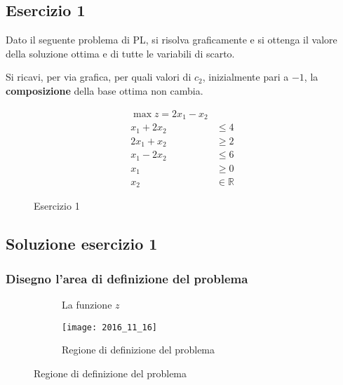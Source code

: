 \documentclass[\main/main.tex]{subfiles}
\begin{document}
\subsection{Esercizio 1}
Dato il seguente problema di PL, si risolva graficamente e si ottenga il valore della soluzione ottima e di tutte le variabili di scarto.

Si ricavi, per via grafica, per quali valori di $c_2$, inizialmente pari a $-1$, la \textbf{composizione} della base ottima non cambia.

\begin{figure}
  \begin{align*}
    \max z = 2x_1 - x_2         \\
    x_1 + 2x_2 & \leq 4         \\
    2x_1 + x_2 & \geq 2         \\
    x_1 - 2x_2 & \leq 6         \\
    x_1        & \geq 0         \\
    x_2        & \in \mathbb{R}
  \end{align*}
  \caption{Esercizio 1}
\end{figure}

\subsection{Soluzione esercizio 1}

\subsubsection*{Disegno l'area di definizione del problema}
\begin{figure}
  \begin{subfigure}{0.45\textwidth}
    \caption{La funzione $z$}
  \end{subfigure}
  \begin{subfigure}{0.45\textwidth}
    \texttt{[image: 2016\_11\_16]}
    \caption{Regione di definizione del problema}
  \end{subfigure}
\end{figure}
\end{document}
